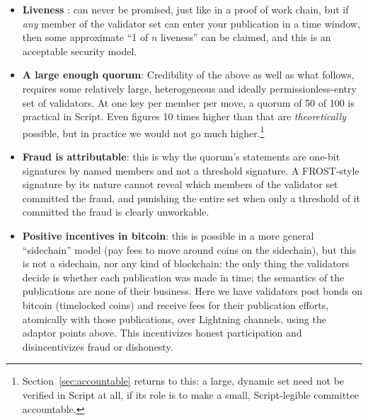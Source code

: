 \documentclass[11pt]{article}
\begin{document}
\begin{itemize}
\item \textbf{Liveness} : can never be promised, just like in a proof of work chain, but if \emph{any} member of the validator set can enter your publication in a time window, then some approximate ``1 of $n$ liveness'' can be claimed, and this is an acceptable security model.
\item \textbf{A large enough quorum}: Credibility of the above as well as what follows, requires some relatively large, heterogeneous and ideally permissionless-entry set of validators. At one key per member per move, a quorum of 50 of 100 is practical in Script. Even figures 10 times higher than that are \emph{theoretically} possible, but in practice we would not go much higher.\footnote{Section~\ref{sec:accountable} returns to this: a large, dynamic set need not be verified in Script at all, if its role is to make a small, Script-legible committee accountable.}
\item \textbf{Fraud is attributable}: this is why the quorum's statements are one-bit signatures by named members and not a threshold signature. A FROST-style signature by its nature cannot reveal which members of the validator set committed the fraud, and punishing the entire set when only a threshold of it committed the fraud is clearly unworkable.
\item \textbf{Positive incentives in bitcoin}: this is possible in a more general ``sidechain'' model (pay fees to move around coins on the sidechain), but this is not a sidechain, nor any kind of blockchain: the only thing the validators decide is whether each publication was made in time; the semantics of the publications are none of their business. Here we have validators post bonds on bitcoin (timelocked coins) and receive fees for their publication efforts, atomically with those publications, over Lightning channels, using the adaptor points above. This incentivizes honest participation and disincentivizes fraud or dishonesty.
\end{itemize}
\end{document}
